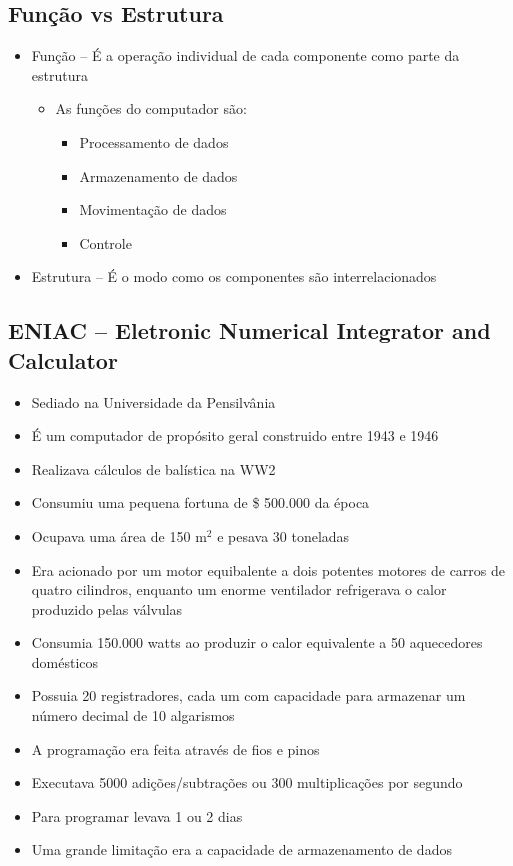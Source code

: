 \documentclass[12pt]{article}
\begin{document}
    \subsection{Função vs Estrutura}
    \begin{itemize}
        \item Função -- É a operação individual de cada componente como parte 
        da estrutura
        \begin{itemize}
            \item As funções do computador são:
            \begin{itemize}
                \item Processamento de dados
                \item Armazenamento de dados
                \item Movimentação de dados
                \item Controle
            \end{itemize}
        \end{itemize}
        \item Estrutura -- É o modo como os componentes são interrelacionados
    \end{itemize}
    \subsection{ENIAC -- Eletronic Numerical Integrator and Calculator}
    \begin{itemize}
        \item Sediado na Universidade da Pensilvânia
        \item É um computador de propósito geral construido entre 1943 e 1946
        \item Realizava cálculos de balística na WW2
        \item Consumiu uma pequena fortuna de \$ 500.000 da época
        \item Ocupava uma área de 150 m$^2$ e pesava 30 toneladas
        \item Era acionado por um motor equibalente a dois potentes motores de 
        carros de quatro cilindros, enquanto um enorme ventilador refrigerava o 
        calor produzido pelas válvulas
        \item Consumia 150.000 watts ao produzir o calor equivalente a 50 
        aquecedores domésticos
        \item Possuia 20 registradores, cada um com capacidade para armazenar 
        um número decimal de 10 algarismos
        \item A programação era feita através de fios e pinos
        \item Executava 5000 adições/subtrações ou 300 multiplicações por segundo
        \item Para programar levava 1 ou 2 dias
        \item Uma grande limitação era a capacidade de armazenamento de dados
    \end{itemize}
\end{document}

